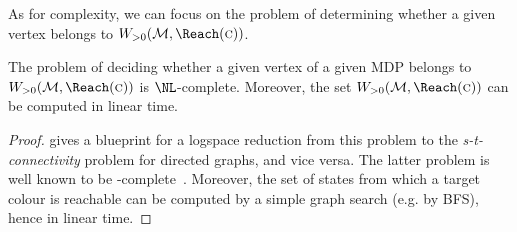 %	
%	
%	
%	

\noindent
As for complexity, we can focus on the problem of determining whether a given 
vertex belongs to $\winPos(\mdp,\Reach(\genColour))$. 

\begin{corollary}
\label{5-cor:pos-complexity}
The problem of deciding whether a given vertex of a given MDP belongs to 
$\winPos(\mdp,\Reach(\genColour))$ is $\NL$-complete. Moreover, the set $\winPos(\mdp,\Reach(\genColour))$ can be computed in linear time.
\end{corollary}
\begin{proof}
gives a blueprint for a logspace reduction from this problem to the 
\emph{s-t-connectivity} problem for directed graphs, and vice versa. The latter 
problem is well known to be \NL-complete~\cite{Savitch:1970}. Moreover, the set of states from which a target colour is reachable can be computed by a simple graph search (e.g. by BFS), hence in linear time.
\end{proof}





